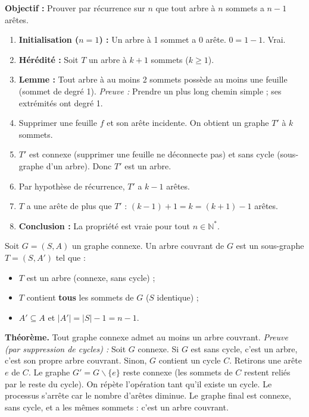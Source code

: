 \documentclass[11pt]{article}
\newcommand{\cle}[1]{{\popxbold\color{popdark}#1}}
\def\setminus{\mathbin{\backslash}}\let\smallsetminus\setminus
\begin{document}
\begin{experience}
\textbf{Objectif :} Prouver par récurrence sur $n$ que tout arbre à $n$ sommets a $n-1$ arêtes.
\begin{enumerate}
  \item \textbf{Initialisation ($n=1$) :} Un arbre à 1 sommet a 0 arête. $0 = 1-1$. Vrai.
  \item \textbf{Hérédité :} Soit $T$ un arbre à $k+1$ sommets ($k \ge 1$).
  \item \textbf{Lemme :} Tout arbre à au moins 2 sommets possède au moins une \cle{feuille} (sommet de degré 1). \emph{Preuve :} Prendre un plus long chemin simple ; ses extrémités ont degré 1.
  \item Supprimer une feuille $f$ et son arête incidente. On obtient un graphe $T'$ à $k$ sommets.
  \item $T'$ est connexe (supprimer une feuille ne déconnecte pas) et sans cycle (sous-graphe d'un arbre). Donc $T'$ est un arbre.
  \item Par hypothèse de récurrence, $T'$ a $k-1$ arêtes.
  \item $T$ a une arête de plus que $T'$ : $(k-1)+1 = k = (k+1)-1$ arêtes.
  \item \textbf{Conclusion :} La propriété est vraie pour tout $n \in \mathbb{N}^*$.
\end{enumerate}
\end{experience}

\begin{definition}
Soit $G = (S, A)$ un graphe connexe. Un \cle{arbre couvrant} de $G$ est un sous-graphe $T = (S, A')$ tel que :
\begin{itemize}
  \item $T$ est un arbre (connexe, sans cycle) ;
  \item $T$ contient \textbf{tous} les sommets de $G$ ($S$ identique) ;
  \item $A' \subseteq A$ et $|A'| = |S| - 1 = n-1$.
\end{itemize}
\end{definition}

\begin{propriete}
\textbf{Théorème.} Tout graphe connexe admet au moins un arbre couvrant.
\emph{Preuve (par suppression de cycles) :}
Soit $G$ connexe. Si $G$ est sans cycle, c'est un arbre, c'est son propre arbre couvrant.
Sinon, $G$ contient un cycle $C$. Retirons une arête $e$ de $C$. Le graphe $G' = G \setminus \{e\}$ reste connexe (les sommets de $C$ restent reliés par le reste du cycle). On répète l'opération tant qu'il existe un cycle. Le processus s'arrête car le nombre d'arêtes diminue. Le graphe final est connexe, sans cycle, et a les mêmes sommets : c'est un arbre couvrant.
\end{propriete}
\end{document}
